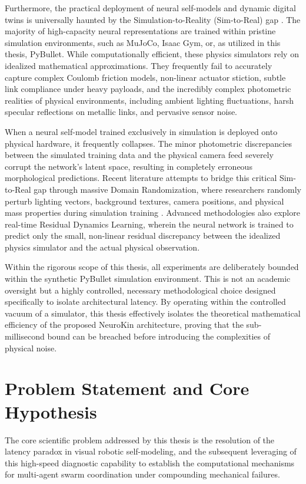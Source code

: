 ﻿\documentclass[12pt,a4paper,oneside]{report}
\begin{document}
Furthermore, the practical deployment of neural self-models and dynamic digital twins is universally haunted by the Simulation-to-Reality (Sim-to-Real) gap \cite{tan2018simtoreal}. The majority of high-capacity neural representations are trained within pristine simulation environments, such as MuJoCo, Isaac Gym, or, as utilized in this thesis, PyBullet. While computationally efficient, these physics simulators rely on idealized mathematical approximations. They frequently fail to accurately capture complex Coulomb friction models, non-linear actuator stiction, subtle link compliance under heavy payloads, and the incredibly complex photometric realities of physical environments, including ambient lighting fluctuations, harsh specular reflections on metallic links, and pervasive sensor noise.

When a neural self-model trained exclusively in simulation is deployed onto physical hardware, it frequently collapses. The minor photometric discrepancies between the simulated training data and the physical camera feed severely corrupt the network's latent space, resulting in completely erroneous morphological predictions. Recent literature attempts to bridge this critical Sim-to-Real gap through massive Domain Randomization, where researchers randomly perturb lighting vectors, background textures, camera positions, and physical mass properties during simulation training \cite{tan2018simtoreal}. Advanced methodologies also explore real-time Residual Dynamics Learning, wherein the neural network is trained to predict only the small, non-linear residual discrepancy between the idealized physics simulator and the actual physical observation.

Within the rigorous scope of this thesis, all experiments are deliberately bounded within the synthetic PyBullet simulation environment. This is not an academic oversight but a highly controlled, necessary methodological choice designed specifically to isolate architectural latency. By operating within the controlled vacuum of a simulator, this thesis effectively isolates the theoretical mathematical efficiency of the proposed NeuroKin architecture, proving that the sub-millisecond bound can be breached before introducing the complexities of physical noise.

\section{Problem Statement and Core Hypothesis}

The core scientific problem addressed by this thesis is the resolution of the latency paradox in visual robotic self-modeling, and the subsequent leveraging of this high-speed diagnostic capability to establish the computational mechanisms for multi-agent swarm coordination under compounding mechanical failures.
\end{document}
